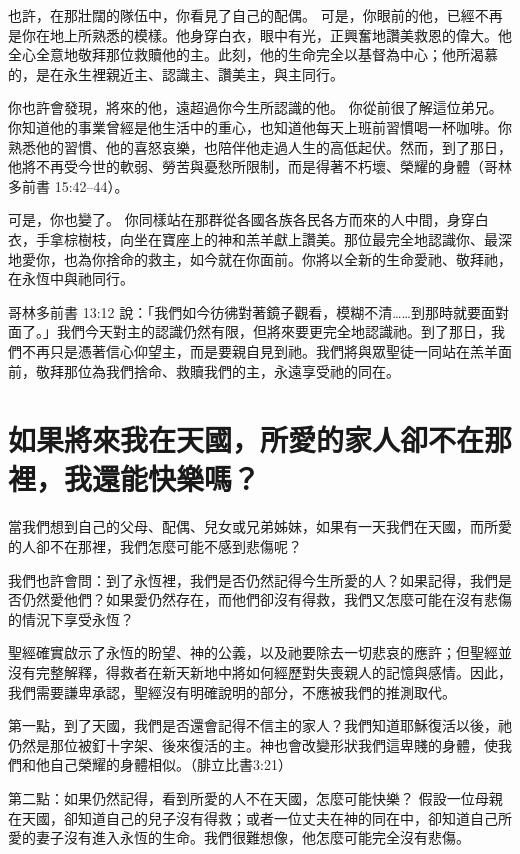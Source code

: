 也許，在那壯闊的隊伍中，你看見了自己的配偶。
可是，你眼前的他，已經不再是你在地上所熟悉的模樣。他身穿白衣，眼中有光，正興奮地讚美救恩的偉大。他全心全意地敬拜那位救贖他的主。此刻，他的生命完全以基督為中心；他所渴慕的，是在永生裡親近主、認識主、讚美主，與主同行。

你也許會發現，將來的他，遠超過你今生所認識的他。
你從前很了解這位弟兄。你知道他的事業曾經是他生活中的重心，也知道他每天上班前習慣喝一杯咖啡。你熟悉他的習慣、他的喜怒哀樂，也陪伴他走過人生的高低起伏。然而，到了那日，他將不再受今世的軟弱、勞苦與憂愁所限制，而是得著不朽壞、榮耀的身體（哥林多前書 15:42--44）。

可是，你也變了。
你同樣站在那群從各國各族各民各方而來的人中間，身穿白衣，手拿棕樹枝，向坐在寶座上的神和羔羊獻上讚美。那位最完全地認識你、最深地愛你，也為你捨命的救主，如今就在你面前。你將以全新的生命愛祂、敬拜祂，在永恆中與祂同行。

哥林多前書 13:12 說：「我們如今彷彿對著鏡子觀看，模糊不清……到那時就要面對面了。」我們今天對主的認識仍然有限，但將來要更完全地認識祂。到了那日，我們不再只是憑著信心仰望主，而是要親自見到祂。我們將與眾聖徒一同站在羔羊面前，敬拜那位為我們捨命、救贖我們的主，永遠享受祂的同在。



\section*{如果將來我在天國，所愛的家人卻不在那裡，我還能快樂嗎？}

當我們想到自己的父母、配偶、兒女或兄弟姊妹，如果有一天我們在天國，而所愛的人卻不在那裡，我們怎麼可能不感到悲傷呢？

我們也許會問：到了永恆裡，我們是否仍然記得今生所愛的人？如果記得，我們是否仍然愛他們？如果愛仍然存在，而他們卻沒有得救，我們又怎麼可能在沒有悲傷的情況下享受永恆？

聖經確實啟示了永恆的盼望、神的公義，以及祂要除去一切悲哀的應許；但聖經並沒有完整解釋，得救者在新天新地中將如何經歷對失喪親人的記憶與感情。因此，我們需要謙卑承認，聖經沒有明確說明的部分，不應被我們的推測取代。

第一點，到了天國，我們是否還會記得不信主的家人？我們知道耶穌復活以後，祂仍然是那位被釘十字架、後來復活的主。神也會改變形狀我們這卑賤的身體，使我們和他自己榮耀的身體相似。（腓立比書3:21）

第二點：如果仍然記得，看到所愛的人不在天國，怎麼可能快樂？
假設一位母親在天國，卻知道自己的兒子沒有得救；或者一位丈夫在神的同在中，卻知道自己所愛的妻子沒有進入永恆的生命。我們很難想像，他怎麼可能完全沒有悲傷。

